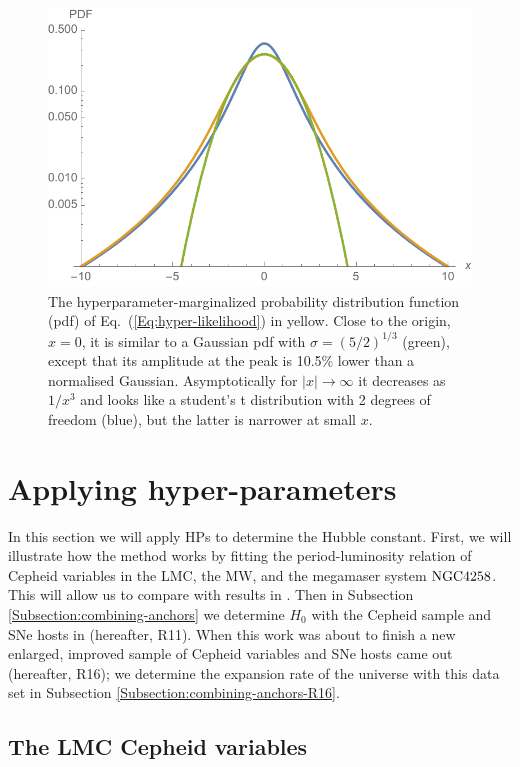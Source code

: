 \begin{figure}[hbtp]
\centering
\includegraphics[scale=1]{figures/chapter-h0/hyperparam_like.pdf}
\caption{The hyperparameter-marginalized probability distribution function (pdf) of Eq.\ (\ref{Eq:hyper-likelihood}) in yellow. Close to the origin, $x=0$, it is similar to a Gaussian pdf with $\sigma = (5/2)^{1/3}$ (green), except that its amplitude at the peak is 10.5\% lower than a normalised Gaussian. Asymptotically for $|x|\rightarrow\infty$ it decreases as $1/x^3$ and looks like a student's t distribution with 2 degrees of freedom (blue), but the latter is narrower at small $x$.}
\end{figure}

\section{Applying hyper-parameters}
\label{chapter-h0:Application}

In this section we will apply HPs to determine the Hubble constant. First, we will illustrate how the method works by fitting the period-luminosity relation of Cepheid variables in the LMC, the MW, and the megamaser system $\mathrm{NGC4258}$. This will allow us to compare with results in \cite{Efstathiou:2013via}. Then in Subsection \ref{Subsection:combining-anchors} we determine $H_0$ with the Cepheid sample and SNe hosts in \cite{Riess:2011yx} (hereafter, R11). When this work was about to finish a new enlarged, improved sample of Cepheid variables and SNe hosts came out \cite{Riess:2016jrr} (hereafter, R16); we determine the expansion rate of the universe with this data set in Subsection \ref{Subsection:combining-anchors-R16}.  

\subsection{The LMC Cepheid variables}
\label{Subsection:LMC}

